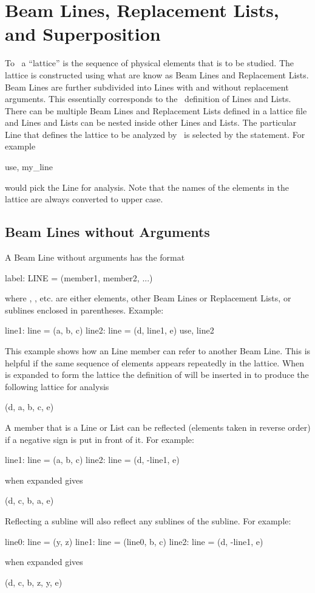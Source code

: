 \chapter{Beam Lines, Replacement Lists, and Superposition}

To \bmad\ a ``lattice'' is the sequence of physical elements that is to
be studied. The lattice is constructed using what are know as Beam Lines
and Replacement Lists. Beam Lines are further subdivided into Lines with
and without replacement arguments. This essentially corresponds to the
\mad\ definition of Lines and Lists. There can be multiple Beam Lines
and Replacement Lists defined in a lattice file and Lines and Lists can
be nested inside other Lines and Lists. The particular Line that defines
the lattice to be analyzed by \bmad\ is selected by the 
statement. For example
\begin{example}
  use, my_line
\end{example}
would pick the Line  for analysis. 
Note that the names of the elements in the
lattice are always converted to upper case.

\section{Beam Lines without Arguments}
A Beam Line without arguments has the format
\begin{example}
  label: LINE = (member1, member2, ...)
\end{example}
where , , etc. are either elements, other Beam
Lines or Replacement Lists, or sublines enclosed in parentheses.
Example:
\begin{example}
  line1: line = (a, b, c)
  line2: line = (d, line1, e)
  use, line2
\end{example}
This example shows how an Line member can refer to another Beam Line.
This is helpful if the same sequence of elements appears repeatedly in
the lattice. When  is expanded to form the lattice the
definition of  will be inserted in to produce the following
lattice for analysis
\begin{example}
  (d, a, b, c, e)
\end{example}

A member that is a Line or List can be reflected 
(elements taken in reverse order) if
a negative sign is put in front of it. For example:
\begin{example}
  line1: line = (a, b, c)
  line2: line = (d, -line1, e)
\end{example}
 when expanded gives
\begin{example}
  (d, c, b, a, e)
\end{example}
Reflecting a subline will also reflect any sublines of the subline. For
example:
\begin{example}
  line0: line = (y, z)
  line1: line = (line0, b, c)
  line2: line = (d, -line1, e)
\end{example}
 when expanded gives
\begin{example}
  (d, c, b, z, y, e)
\end{example}

